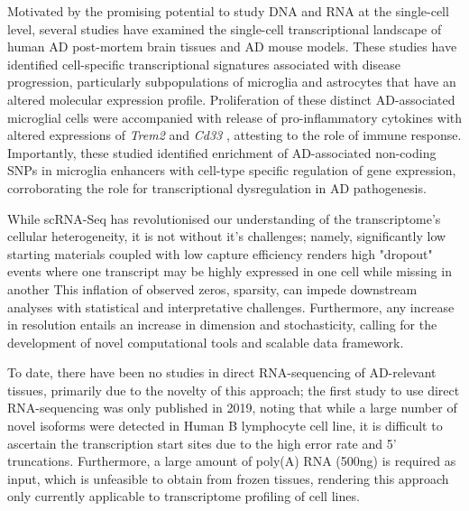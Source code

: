 Motivated by the promising potential to study DNA and RNA at the single-cell level, several studies have examined the single-cell transcriptional landscape of human AD post-mortem brain tissues\cite{Mathys2019,Nott2019,Thrupp2020,Olah2020,Leng2021,Young2021} and AD mouse models\cite{Keren-Shaul2017,Mathys2017}. These studies have identified cell-specific transcriptional signatures associated with disease progression, particularly subpopulations of microglia and astrocytes that have an altered molecular expression profile. Proliferation of these distinct AD-associated microglial cells were accompanied with release of pro-inflammatory cytokines\cite{Mathys2017} with altered expressions of \textit{Trem2} and \textit{Cd33} \cite{Mathys2019,Frigerio2019}, attesting to the role of immune response. Importantly, these studied identified enrichment of AD-associated non-coding SNPs in microglia enhancers with cell-type specific regulation of gene expression\cite{Tansey2018,Nott2019,Young2021,Novikova2021}, corroborating the role for transcriptional dysregulation in AD pathogenesis.   

While scRNA-Seq has revolutionised our understanding of the transcriptome's cellular heterogeneity, it is not without it's challenges; namely, significantly low starting materials coupled with low capture efficiency renders high "dropout" events where one transcript may be highly expressed in one cell while missing in another\cite{Lahnemann2020,Adil2021} This inflation of observed zeros, sparsity, can impede downstream analyses with statistical and interpretative challenges\cite{Adil2021}. Furthermore, any increase in resolution entails an increase in dimension and stochasticity, calling for the development of novel computational tools and scalable data framework\cite{Lahnemann2020}. 


To date, there have been no studies in direct RNA-sequencing of AD-relevant tissues, primarily due to the novelty of this approach; the first study to use direct RNA-sequencing was only published in 2019, noting that while a large number of novel isoforms were detected in Human B lymphocyte cell line, it is difficult to ascertain the transcription start sites due to the high error rate and 5' truncations\cite{Workman2019a}. Furthermore, a large amount of poly(A) RNA (500ng) is required as input, which is unfeasible to obtain from frozen tissues, rendering this approach only currently applicable to transcriptome profiling of cell lines.      
  

